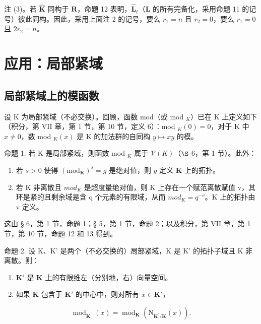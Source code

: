 注 (3)。若 \(\hat{\mathbf{K}}\) 同构于 \(\mathbf{R}\)，命题 12 表明，\(\hat{\mathbf{L}}_t\)（\(\mathbf{L}\) 的所有完备化，采用命题 11 的记号）彼此同构。因此，采用上面注 2 的记号，要么 \(r_1 = n\) 且 \(r_2 = 0\)，要么 \(r_1 = 0\) 且 \(2r_2 = n\)。

\section{应用：局部紧域}

\subsection{局部紧域上的模函数}

设 K 为局部紧域（不必交换）。回顾，函数 mod（或 mod \(_K\)）已在 K 上定义如下（积分，第 VII 章，第 1 节，第 10 节，定义 6）：mod \(_K(0) = 0\)，对于 K 中 \(x \neq 0\)，数 mod \(_K(x)\) 是 K 的加法群的自同构 \(y \mapsto xy\) 的模。

命题 1. 若 K 是局部紧域，则函数 mod \(_{K}\) 属于 \(\mathcal{V}(K)\)（\(\S\) 6，第 1 节）。此外：

\begin{enumerate}
\def\labelenumi{(\roman{enumi})}
\item
  若 \(s > 0\) 使得 \((\mathrm{mod}_{\mathbf{K}})^s = g\) 是绝对值，则 \(g\) 定义 \(\mathbf{K}\) 上的拓扑。
\item
  若 K 非离散且 \(mod_{K}\) 是超度量绝对值，则 K 上存在一个赋范离散赋值 v，其环是紧的且剩余域是含 q 个元素的有限域，从而 \(mod_{K} = q^{-v}\)。K 上的拓扑由 v 定义。
\end{enumerate}

这由 § 6，第 1 节，命题 1；§ 5，第 1 节，命题 2；以及积分，第 VII 章，第 1 节，第 10 节，命题 12 和 13 得到。

命题 2. 设 K、K' 是两个（不必交换的）局部紧域，K 是 K' 的拓扑子域且 K 非离散。则：

\begin{enumerate}
\def\labelenumi{(\roman{enumi})}
\item
  \(\mathbf{K}'\) 是 \(\mathbf{K}\) 上的有限维左（分别地，右）向量空间。
\item
  如果 \(\mathbf{K}\) 包含于 \(\mathbf{K}'\) 的中心中，则对所有 \(x \in \mathbf{K}'\)，
\end{enumerate}

\[
\operatorname{mod} _ {\mathbf {K} ^ {\prime}} (x) = \operatorname{mod} _ {\mathbf {K}} (\mathrm{N} _ {\mathbf {K} ^ {\prime} / \mathbf {K}} (x)).\tag{1}
\]

